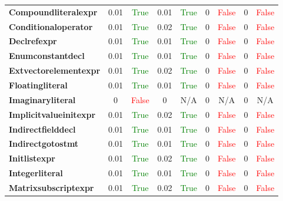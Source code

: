\documentclass{article}
\begin{document}
\begin{xltabular}{\textwidth}{lcccccccc}
\textbf{{\fontsize{10}{12}\selectfont Compoundliteralexpr}}& 0.01&\textcolor{green}{True}& 0.01&\textcolor{green}{True}& 0&\textcolor{red}{False}& 0&\textcolor{red}{False} \\[0.5ex]
\textbf{{\fontsize{10}{12}\selectfont Conditionaloperator}}& 0.01&\textcolor{green}{True}& 0.02&\textcolor{green}{True}& 0&\textcolor{red}{False}& 0&\textcolor{red}{False} \\[0.5ex]
\textbf{{\fontsize{10}{12}\selectfont Declrefexpr}}& 0.01&\textcolor{green}{True}& 0.01&\textcolor{green}{True}& 0&\textcolor{red}{False}& 0&\textcolor{red}{False} \\[0.5ex]
\textbf{{\fontsize{10}{12}\selectfont Enumconstantdecl}}& 0.01&\textcolor{green}{True}& 0.01&\textcolor{green}{True}& 0&\textcolor{red}{False}& 0&\textcolor{red}{False} \\[0.5ex]
\textbf{{\fontsize{10}{12}\selectfont Extvectorelementexpr}}& 0.01&\textcolor{green}{True}& 0.02&\textcolor{green}{True}& 0&\textcolor{red}{False}& 0&\textcolor{red}{False} \\[0.5ex]
\textbf{{\fontsize{10}{12}\selectfont Floatingliteral}}& 0.01&\textcolor{green}{True}& 0.01&\textcolor{green}{True}& 0&\textcolor{red}{False}& 0&\textcolor{red}{False} \\[0.5ex]
\textbf{{\fontsize{10}{12}\selectfont Imaginaryliteral}}& 0&\textcolor{red}{False}& 0&N/A& 0&N/A& 0&N/A \\[0.5ex]
\textbf{{\fontsize{10}{12}\selectfont Implicitvalueinitexpr}}& 0.01&\textcolor{green}{True}& 0.02&\textcolor{green}{True}& 0&\textcolor{red}{False}& 0&\textcolor{red}{False} \\[0.5ex]
\textbf{{\fontsize{10}{12}\selectfont Indirectfielddecl}}& 0.01&\textcolor{green}{True}& 0.01&\textcolor{green}{True}& 0&\textcolor{red}{False}& 0&\textcolor{red}{False} \\[0.5ex]
\textbf{{\fontsize{10}{12}\selectfont Indirectgotostmt}}& 0.01&\textcolor{green}{True}& 0.01&\textcolor{green}{True}& 0&\textcolor{red}{False}& 0&\textcolor{red}{False} \\[0.5ex]
\textbf{{\fontsize{10}{12}\selectfont Initlistexpr}}& 0.01&\textcolor{green}{True}& 0.02&\textcolor{green}{True}& 0&\textcolor{red}{False}& 0&\textcolor{red}{False} \\[0.5ex]
\textbf{{\fontsize{10}{12}\selectfont Integerliteral}}& 0.01&\textcolor{green}{True}& 0.01&\textcolor{green}{True}& 0&\textcolor{red}{False}& 0&\textcolor{red}{False} \\[0.5ex]
\textbf{{\fontsize{10}{12}\selectfont Matrixsubscriptexpr}}& 0.01&\textcolor{green}{True}& 0.02&\textcolor{green}{True}& 0&\textcolor{red}{False}& 0&\textcolor{red}{False} \\[0.5ex]

\end{xltabular}
\end{document}
